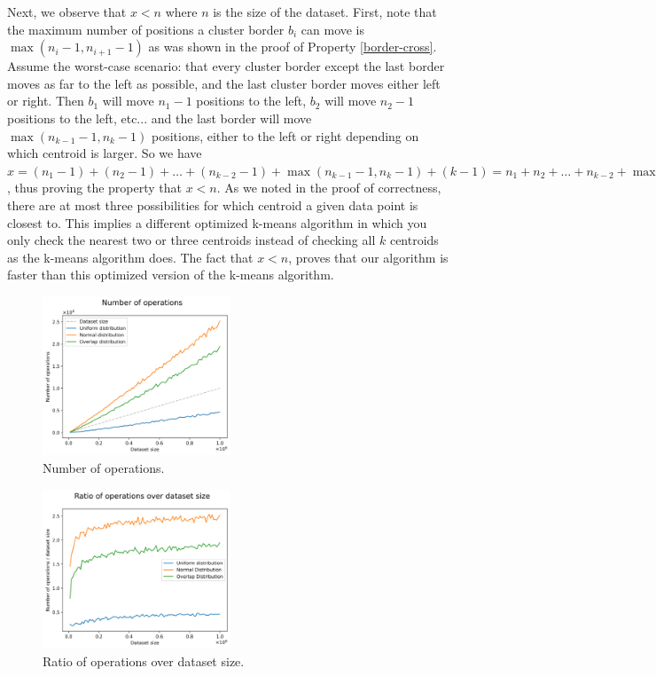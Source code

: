 \documentclass[conference,compsoc]{IEEEtran}
\begin{document}
Next, we observe that $x < n$ where $n$ is the size of the dataset. First, note that the maximum number of positions a cluster border $b_i$ can move is $\max(n_{i}-1, n_{i+1}-1)$ as was shown in the proof of Property \ref{border-cross}. Assume the worst-case scenario: that every cluster border except the last border moves as far to the left as possible, and the last cluster border moves either left or right. Then $b_1$ will move $n_1-1$ positions to the left, $b_2$ will move $n_2-1$ positions to the left, etc... and the last border will move $\max(n_{k-1}-1, n_k-1)$ positions, either to the left or right depending on which centroid is larger. So we have $x = (n_1-1)+(n_2-1) + \dots + (n_{k-2}-1) + \max(n_{k-1}-1, n_k-1) + (k-1) = n_1 + n_2 + \dots + n_{k-2} + \max(n_{k-1}-1, n_k-1) + 1 \leq n_1 + n_2 + \dots + n_{k-2} + \max(n_{k-1}, n_k) < n_1 + n_2 + \dots + n_{k-1} + n_k$, thus proving the property that $x < n$. As we noted in the proof of correctness, there are at most three possibilities for which centroid a given data point is closest to. This implies a different optimized k-means algorithm in which you only check the nearest two or three centroids instead of checking all $k$ centroids as the k-means algorithm does. The fact that $x < n$, proves that our algorithm is faster than this optimized version of the k-means algorithm.

\begin{figure}[htbp]
    \centerline{\includegraphics[width=0.5\textwidth]{figures/fig1.png}}
    \caption{Number of operations.}
    \label{fig1}
\end{figure}

\begin{figure}[htbp]
    \centerline{\includegraphics[width=0.5\textwidth]{figures/fig2.png}}
    \caption{Ratio of operations over dataset size.}
    \label{fig2}
\end{figure}
\end{document}
